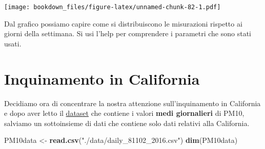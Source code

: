 \documentclass[]{book}
\newenvironment{Shaded}{\begin{snugshade}}{\end{snugshade}}
\newcommand{\ControlFlowTok}[1]{\textcolor[rgb]{0.13,0.29,0.53}{\textbf{#1}}}
\newcommand{\DataTypeTok}[1]{\textcolor[rgb]{0.13,0.29,0.53}{#1}}
\newcommand{\DecValTok}[1]{\textcolor[rgb]{0.00,0.00,0.81}{#1}}
\newcommand{\FloatTok}[1]{\textcolor[rgb]{0.00,0.00,0.81}{#1}}
\newcommand{\KeywordTok}[1]{\textcolor[rgb]{0.13,0.29,0.53}{\textbf{#1}}}
\newcommand{\NormalTok}[1]{#1}
\newcommand{\OperatorTok}[1]{\textcolor[rgb]{0.81,0.36,0.00}{\textbf{#1}}}
\newcommand{\OtherTok}[1]{\textcolor[rgb]{0.56,0.35,0.01}{#1}}
\newcommand{\StringTok}[1]{\textcolor[rgb]{0.31,0.60,0.02}{#1}}
\begin{document}
\begin{Shaded}
\end{Shaded}

\texttt{[image: bookdown\_files/figure-latex/unnamed-chunk-82-1.pdf]}

Dal grafico possiamo capire come si distribuiscono le misurazioni rispetto ai giorni della settimana.
Si usi l'help per comprendere i parametri che sono stati usati.

\hypertarget{inquinamento-in-california}{%
\section{Inquinamento in California}\label{inquinamento-in-california}}

Decidiamo ora di concentrare la nostra attenzione sull'inquinamento in California e dopo aver letto il \href{https://www.dropbox.com/s/z926dmp2lvdz48p/daily_81102_2016.csv?dl=1}{dataset} che contiene i valori \textbf{medi giornalieri} di PM10, salviamo un sottoinsieme di dati che contiene solo dati relativi alla California.

\begin{Shaded}
\begin{Highlighting}[]
\NormalTok{PM10data <-}\StringTok{ }\KeywordTok{read.csv}\NormalTok{(}\StringTok{"./data/daily_81102_2016.csv"}\NormalTok{)}
\KeywordTok{dim}\NormalTok{(PM10data)}
\end{Highlighting}
\end{Shaded}
\end{document}
